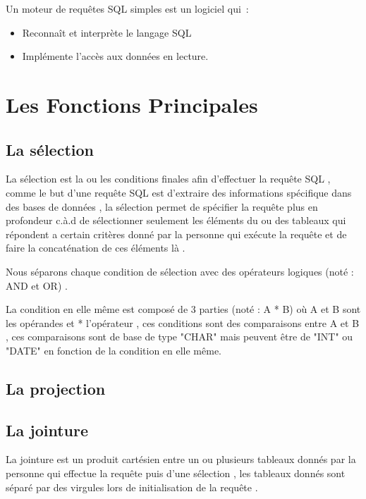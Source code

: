\documentclass[oneside,13pt,a4paper]{report}
\begin{document}
        Un moteur de requêtes SQL simples est un logiciel qui :
        \begin{itemize}
            \item Reconnaît et interprète le langage SQL 
            \item Implémente l’accès aux données en lecture.
        \end{itemize}

    \section{Les Fonctions Principales}

        \subsection{La sélection}

            La sélection est la ou les conditions finales afin d'effectuer la requête SQL , comme le but d'une requête SQL est d'extraire des informations spécifique dans des bases de données , la sélection permet de spécifier la requête plus en profondeur c.à.d de sélectionner seulement les éléments du ou des tableaux qui répondent a certain critères donné par la personne qui exécute la requête et de faire la concaténation de ces éléments là .

    	    Nous séparons chaque condition de sélection avec des opérateurs logiques (noté : AND et OR) .

	        La condition en elle même est composé de 3 parties (noté : A * B) où A et B sont les opérandes et * l'opérateur , ces conditions sont des comparaisons entre A et B , ces comparaisons sont de base de type "CHAR" mais peuvent être de "INT" ou "DATE" en fonction de la condition en elle même.

        \subsection{La projection}

        \subsection{La jointure}

            La jointure est un produit cartésien entre un ou plusieurs tableaux donnés par la personne qui effectue la requête puis d'une sélection , les tableaux donnés sont séparé par des virgules lors de initialisation de la requête .
	        
\end{document}
